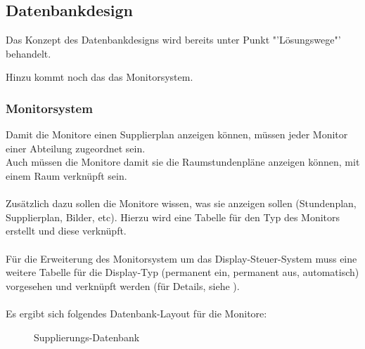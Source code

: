 \subsection{Datenbankdesign}

Das Konzept des Datenbankdesigns wird bereits unter Punkt "'Lösungswege"' behandelt.

Hinzu kommt noch das das Monitorsystem.

\subsubsection{Monitorsystem}

Damit die Monitore einen Supplierplan anzeigen können, müssen jeder Monitor einer Abteilung zugeordnet sein.\\
Auch müssen die Monitore damit sie die Raumstundenpläne anzeigen können, mit einem Raum verknüpft sein.\\
\\
Zusätzlich dazu sollen die Monitore wissen, was sie anzeigen sollen (Stundenplan, Supplierplan, Bilder, etc). Hierzu wird eine Tabelle für den Typ des Monitors erstellt und diese verknüpft.\\
\\ 
Für die Erweiterung des Monitorsystem um das Display-Steuer-System muss eine weitere Tabelle für die Display-Typ (permanent ein, permanent aus, automatisch) vorgesehen und verknüpft werden (für Details, siehe ).\\
\\
Es ergibt sich folgendes Datenbank-Layout für die Monitore:
\begin{figure}[H]
\centering
{}
\caption{Supplierungs-Datenbank}
\end{figure}
